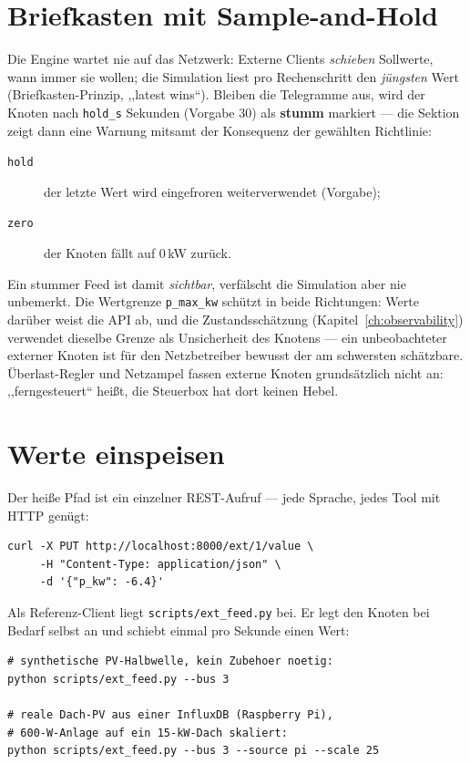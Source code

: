 \documentclass[11pt,a4paper,parskip=half]{scrreprt}
\begin{document}
\section{Briefkasten mit Sample-and-Hold}

Die Engine wartet nie auf das Netzwerk: Externe Clients
\emph{schieben} Sollwerte, wann immer sie wollen; die Simulation liest
pro Rechenschritt den \emph{jüngsten} Wert (Briefkasten-Prinzip,
,,latest wins``). Bleiben die Telegramme aus, wird der Knoten nach
\texttt{hold\_s} Sekunden (Vorgabe 30) als \textbf{stumm} markiert ---
die Sektion zeigt dann eine Warnung mitsamt der Konsequenz der
gewählten Richtlinie:

\begin{description}
  \item[\texttt{hold}] der letzte Wert wird eingefroren
    weiterverwendet (Vorgabe);
  \item[\texttt{zero}] der Knoten fällt auf 0\,kW zurück.
\end{description}

Ein stummer Feed ist damit \emph{sichtbar}, verfälscht die Simulation
aber nie unbemerkt. Die Wertgrenze \texttt{p\_max\_kw} schützt in
beide Richtungen: Werte darüber weist die API ab, und die
Zustandsschätzung (Kapitel~\ref{ch:observability}) verwendet dieselbe
Grenze als Unsicherheit des Knotens --- ein unbeobachteter externer
Knoten ist für den Netzbetreiber bewusst der am schwersten schätzbare.
Überlast-Regler und Netzampel fassen externe Knoten grundsätzlich
nicht an: ,,ferngesteuert`` heißt, die Steuerbox hat dort keinen
Hebel.

\section{Werte einspeisen}

Der heiße Pfad ist ein einzelner REST-Aufruf --- jede Sprache, jedes
Tool mit HTTP genügt:

\begin{lstlisting}
curl -X PUT http://localhost:8000/ext/1/value \
     -H "Content-Type: application/json" \
     -d '{"p_kw": -6.4}'
\end{lstlisting}

Als Referenz-Client liegt \texttt{scripts/ext\_feed.py} bei. Er legt
den Knoten bei Bedarf selbst an und schiebt einmal pro Sekunde einen
Wert:

\begin{lstlisting}
# synthetische PV-Halbwelle, kein Zubehoer noetig:
python scripts/ext_feed.py --bus 3

# reale Dach-PV aus einer InfluxDB (Raspberry Pi),
# 600-W-Anlage auf ein 15-kW-Dach skaliert:
python scripts/ext_feed.py --bus 3 --source pi --scale 25
\end{lstlisting}
\end{document}
